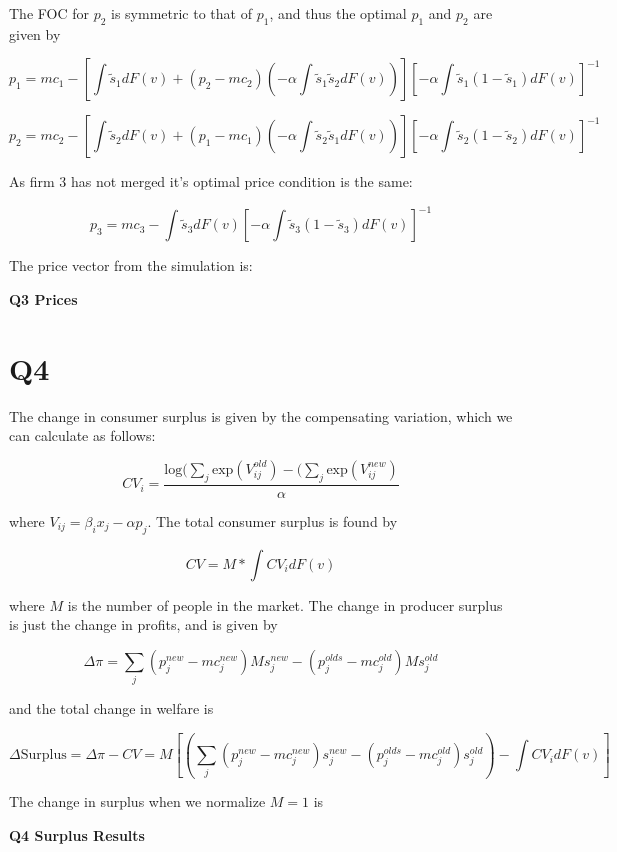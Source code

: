 \documentclass{article}
\newcommand{\1}{\mathbbm{1}}
\begin{document}
The FOC for $p_2$ is symmetric to that of $p_1$, and thus the optimal $p_1$ and $p_2$ are given by

$$p_1 = mc_1 - [\int \tilde{s}_1 dF(v) + (p_2 - mc_2)(- \alpha \int \tilde{s}_1\tilde{s}_2dF(v))][-\alpha \int \tilde{s}_1(1-\tilde{s}_1)dF(v)]^{-1}$$


$$p_2 = mc_2 - [\int \tilde{s}_2 dF(v) + (p_1 - mc_1)(- \alpha \int \tilde{s}_2\tilde{s}_1dF(v))][-\alpha \int \tilde{s}_2(1-\tilde{s}_2)dF(v)]^{-1}$$

As firm 3 has not merged it's optimal price condition is the same:

$$p_3 = mc_3 - \int \tilde{s}_3 dF(v)[ -\alpha \int \tilde{s}_3(1-\tilde{s}_3)dF(v)]^{-1}$$

The price vector from the simulation is: 

\begin{center}
	\centering
	\textbf{Q3 Prices}\par\medskip
	\scalebox{1}{
		
	}
\end{center}

\section{Q4}
The change in consumer surplus is given by the compensating variation, which we can calculate as follows:

$$CV_i = \frac{\text{log}(\sum_j \text{exp}(V_{ij}^{old}) - (\sum_j \text{exp}(V_{ij}^{new})}{\alpha}$$

where $V_{ij} = \beta_ix_j - \alpha p_j$. The total consumer surplus is found by 

$$CV = M*\int CV_i dF(v)$$

where $M$ is the number of people in the market. The change in producer surplus is just the change in profits, and is given by 

$$\Delta \pi = \sum_j (p_j^{new} - mc_j^{new})Ms_j^{new} - (p_j^{olds} - mc_j^{old})Ms_j^{old}$$

and the total change in welfare is 

$$\Delta \text{Surplus} = \Delta \pi - CV = M[(\sum_j (p_j^{new} - mc_j^{new})s_j^{new} - (p_j^{olds} - mc_j^{old})s_j^{old}) - \int CV_i dF(v)] $$

The change in surplus when we normalize $M = 1$ is 


\begin{center}
	\centering
	\textbf{Q4 Surplus Results}\par\medskip
	\scalebox{1}{
		
	}
\end{center}
\end{document}
